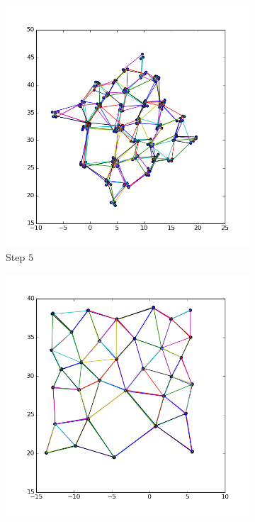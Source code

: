 \documentclass[12pt,a4paper]{article}
\begin{document}
\begin{figure} [htb]
\begin{minipage}[0.2\textheight]{\textwidth}	%
	 \begin{subfigure}{0.5\textwidth}
		   \centering
           \includegraphics[scale=0.3]{results_Harel/rand1/HK_step5_eps1.png}
           \caption{Step $5$}
     \end{subfigure}
	 \begin{subfigure}{0.5\textwidth}
	 			\centering
            \includegraphics[scale=0.3]{results_Harel/rand01/HK_step5_eps01.png}

\end{subfigure}
\end{minipage}
\end{figure}
\end{document}

